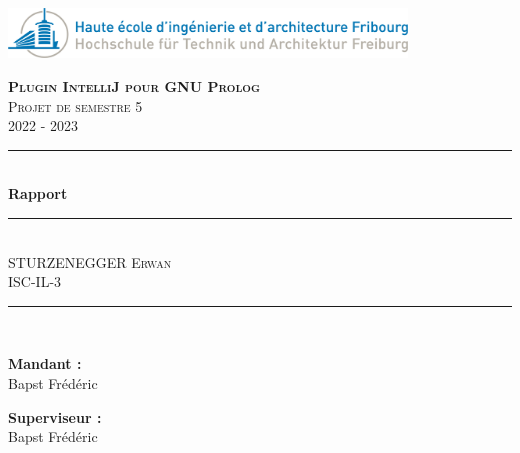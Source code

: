 \newcommand{\HRule}{\rule{\linewidth}{0.5mm}}

\begingroup
    \centering
    \begin{titlepage}
        \includegraphics[width=400px]{images/logo_heia-fr.png}
        \vspace{1.5cm}
        
        {\scshape\LARGE\bfseries Plugin IntelliJ pour GNU Prolog } \\[0.5cm]
        {\scshape\Large Projet de semestre 5}\\[0.5cm]
        {\scshape\Large 2022 - 2023}\\[1cm]
        
        \HRule \\[0.4cm]
        \vspace{0.8cm}
        {\Huge\bfseries Rapport}\\[0.5cm]
        \vspace{0.3cm}
        \HRule \\[.5cm]
        {\scshape STURZENEGGER Erwan}\\[0.5cm]
        {\scshape ISC-IL-3}\\[0.3cm]
        \HRule \\[0.5cm]
        
        \begin{flushleft}
            \large
        	{\bfseries Mandant :}\\
        	Bapst Frédéric
        	\vspace{2em}	
        \end{flushleft}
        
        \begin{flushleft}
            \large
        	{\bfseries Superviseur :}\\
        	Bapst Frédéric
        	\vspace{1em}	
        \end{flushleft}
        
        \vfill
        \centering{\large \today}\\	
    \end{titlepage}
\endgroup
\restoregeometry